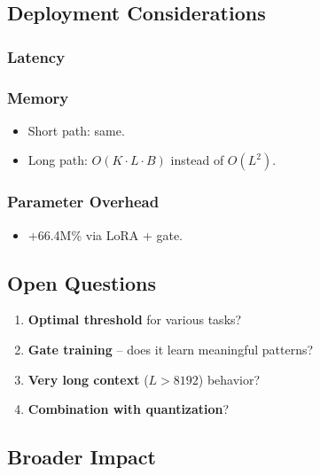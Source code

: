 \subsection{Deployment Considerations}

\subsubsection{Latency}
\subsubsection{Memory}
\begin{itemize}
\item Short path: same.
\item Long path: $O(K \cdot L \cdot B)$ instead of $O(L^2)$.

\end{itemize}
\subsubsection{Parameter Overhead}
\begin{itemize}
\item +66.4M\% via LoRA + gate.

\end{itemize}
\subsection{Open Questions}

\begin{enumerate}
\item \textbf{Optimal threshold} for various tasks?
\item \textbf{Gate training} -- does it learn meaningful patterns?
\item \textbf{Very long context} ($L > 8192$) behavior?
\item \textbf{Combination with quantization}?

\end{enumerate}
\subsection{Broader Impact}

